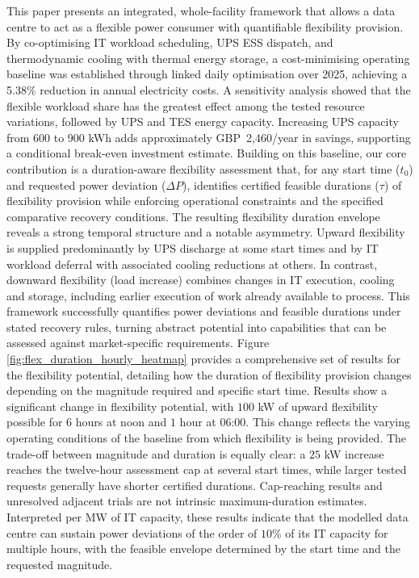 \documentclass[lettersize,journal]{IEEEtran}
\newcommand{\rev}[1]{#1}
\begin{document}
This paper presents an integrated, whole-facility framework that allows a data centre to act as a flexible power consumer with quantifiable flexibility provision. By co-optimising IT workload scheduling, UPS ESS dispatch, and thermodynamic cooling with thermal energy storage, a cost-minimising operating baseline was established through linked daily optimisation over 2025, achieving a \rev{5.38\% reduction in annual electricity costs. A sensitivity analysis showed that the flexible workload share has the greatest effect among the tested resource variations, followed by UPS and TES energy capacity. Increasing UPS capacity from 600 to 900 kWh adds approximately GBP~2,460/year in savings, supporting a conditional break-even investment estimate.} Building on this baseline, our core contribution is a duration-aware flexibility assessment that, for any start time ($t_0$) and requested power deviation ($\Delta P$), identifies certified feasible durations ($\tau$) of flexibility provision while enforcing operational constraints and the specified comparative recovery conditions. The resulting flexibility duration envelope reveals a strong temporal structure and a notable asymmetry. Upward flexibility is supplied predominantly by UPS discharge at some start times and by IT workload deferral with associated cooling reductions at others. In contrast, downward flexibility (load increase) combines changes in IT execution, cooling and storage, including earlier execution of work already available to process. This framework successfully quantifies power deviations and feasible durations under stated recovery rules, turning abstract potential into capabilities that can be assessed against market-specific requirements. Figure \ref{fig:flex_duration_hourly_heatmap} provides a comprehensive set of results for the flexibility potential, detailing how the duration of flexibility provision changes depending on the magnitude required and specific start time. Results show a significant change in flexibility potential, with $100$ kW of upward flexibility possible for $6$ hours at noon and $1$ hour at $06$:$00$. This change reflects the varying operating conditions of the baseline from which flexibility is being provided. \rev{The trade-off between magnitude and duration is equally clear: a $25$ kW increase reaches the twelve-hour assessment cap at several start times, while larger tested requests generally have shorter certified durations. Cap-reaching results and unresolved adjacent trials are not intrinsic maximum-duration estimates. Interpreted per MW of IT capacity, these results indicate that the modelled data centre can sustain power deviations of the order of $10\%$ of its IT capacity for multiple hours, with the feasible envelope determined by the start time and the requested magnitude.}
\end{document}
